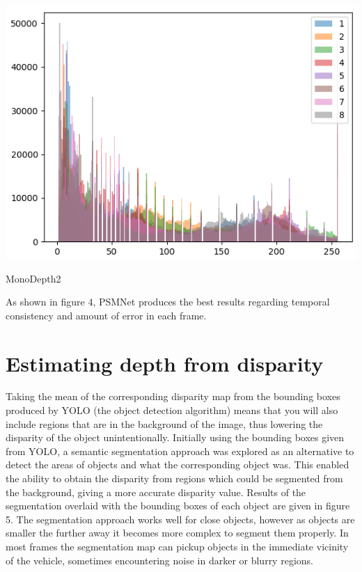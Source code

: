 \documentclass{article}
\begin{document}
\begin{center}
\begin{minipage}{0.33\linewidth}
			\includegraphics[width=\linewidth]{"../_submission/histogram-monocular.png"}
			\begin{center}
				MonoDepth2
			\end{center}

		\end{minipage}
		\vspace{-1em}
	\end{center}

	As shown in figure 4, PSMNet produces the best results regarding temporal consistency and amount of error in each frame.

	\section{Estimating depth from disparity}
	
	Taking the mean of the corresponding disparity map from the bounding boxes produced by YOLO (the object detection algorithm) means that you will also include regions that are in the background of the image, thus lowering the disparity of the object unintentionally. Initially using the bounding boxes given from YOLO, a semantic segmentation approach was explored as an alternative to detect the areas of objects and what the corresponding object was. This enabled the ability to obtain the disparity from regions which could be segmented from the background, giving a more accurate disparity value. Results of the segmentation overlaid with the bounding boxes of each object are given in figure 5. The segmentation approach works well for close objects, however as objects are smaller the further away it becomes more complex to segment them properly. In most frames the segmentation map can pickup objects in the immediate vicinity of the vehicle, sometimes encountering noise in darker or blurry regions.
	
\end{document}
